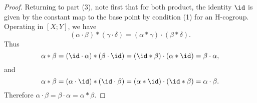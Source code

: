 \begin{proof}
     Returning to part (3), note first that
     for both product, the identity $\id$ is given
     by the constant map to the base point by
     condition (1) for an H-cogroup.\\
     Operating in $\left[ X;Y \right] $, we have
     \[
         \left( \alpha \cdot \beta  \right) *
         \left( \gamma \cdot \delta \right) 
         = \left( \alpha * \gamma \right) \cdot 
         \left( \beta * \delta \right) .
     \] 
     Thus 
     \[
     \alpha * \beta =
     \left( \id \cdot \alpha \right) *
     \left( \beta \cdot \id \right) 
     = \left( \id * \beta \right) \cdot 
     \left( \alpha * \id \right) = 
     \beta \cdot  \alpha,
     \] 
     and
     \[
     \alpha * \beta =
     \left( \alpha \cdot  \id \right) *
     \left( \id \cdot  \beta  \right) =
     \left( \alpha * \id  \right) \cdot 
     \left( \id * \beta  \right) = \alpha \cdot \beta.
     \] 
     Therefore
     $\alpha \cdot  \beta= \beta \cdot  \alpha
     = \alpha * \beta$.



\end{proof}


